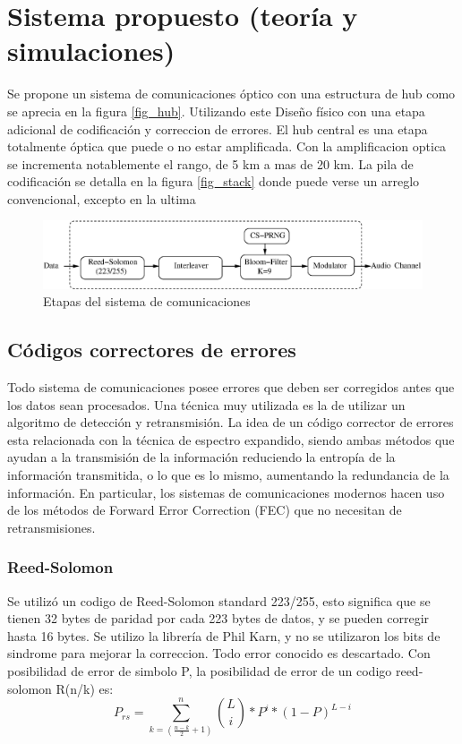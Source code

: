 \chapter{Sistema propuesto (teoría y simulaciones)}

Se propone un sistema de comunicaciones óptico con una estructura de hub como se aprecia en la figura \ref{fig_hub}. Utilizando este Diseño físico con una etapa adicional de codificación y correccion de errores. El hub central es una etapa totalmente óptica que puede o no estar amplificada. Con la amplificacion optica se incrementa notablemente el rango, de 5 km a mas de 20 km.
La pila de codificación se detalla en la figura \ref{fig_stack} donde puede verse un arreglo convencional, excepto en la ultima 

\begin{figure}[t]
\centering
\includegraphics[width=0.9 \textwidth]{Soft-stack2.eps} 
\caption{Etapas del sistema de comunicaciones}
\label{fig_comstack}
\end{figure}

\section{Códigos correctores de errores}

Todo sistema de comunicaciones posee errores que deben ser corregidos antes que los datos sean procesados. Una técnica muy utilizada es la de utilizar un algoritmo de detección y retransmisión.
La idea de un código corrector de errores esta relacionada con la técnica de espectro expandido, siendo ambas métodos que ayudan a la transmisión de la información reduciendo la entropía de la información transmitida, o lo que es lo mismo, aumentando la redundancia de la información. En particular, los sistemas de comunicaciones modernos hacen uso de los métodos de Forward Error Correction (FEC) que no necesitan de retransmisiones.



\subsection{Reed-Solomon}
Se utilizó un codigo de Reed-Solomon standard 223/255, esto significa que se tienen 32 bytes de paridad por cada 223 bytes de datos, y se pueden corregir hasta 16 bytes. Se utilizo la librería de Phil Karn, y no se utilizaron los bits de sindrome para mejorar la correccion. Todo error conocido es descartado.
Con posibilidad de error de simbolo P, la posibilidad de error de un codigo reed-solomon R(n/k) es:
$$P_{rs}= \sum_{k=(\frac{n-k}{2}+1)}^{n} \binom{L}{i} * P^{i} * (1-P)^{L-i} $$

